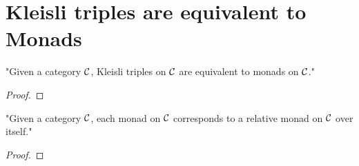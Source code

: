 \chapter{Kleisli triples are equivalent to Monads}

\begin{proposition}
  "Given a category $\mathcal{C}$, Kleisli triples on $\mathcal{C}$ are equivalent to monads on $\mathcal{C}$."
\end{proposition}
\begin{proof}
\end{proof}

\begin{proposition}
  "Given a category $\mathcal{C}$, each monad on $\mathcal{C}$ corresponds to a relative monad on $\mathcal{C}$ over itself."
\end{proposition}
\begin{proof}
\end{proof}



